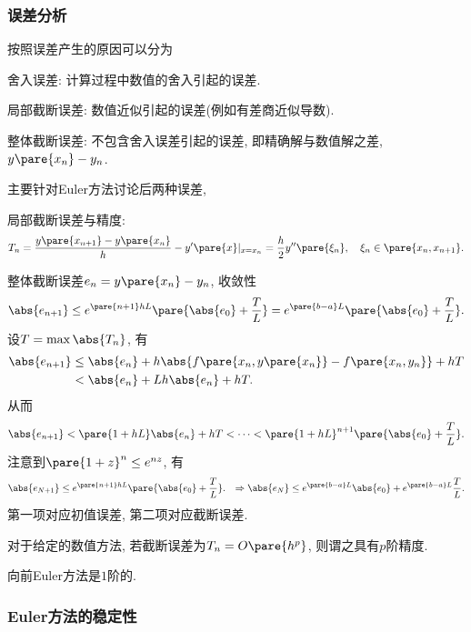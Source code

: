 \documentclass[hidelinks]{ctexart}
\begin{document}

\subsubsection{误差分析} %
\label{ssub:误差分析}

按照误差产生的原因可以分为
\begin{cenum}
    \item 舍入误差: 计算过程中数值的舍入引起的误差.
    \item 局部截断误差: 数值近似引起的误差(例如有差商近似导数).
    \item 整体截断误差: 不包含舍入误差引起的误差, 即精确解与数值解之差, $y\pare{x_n} - y_n$.
\end{cenum}
主要针对Euler方法讨论后两种误差,
\begin{cenum}
    \item 局部截断误差与精度:
    \[ T_n = \frac{y\pare{x_{n+1}} - y\pare{x_n}}{h} - y'\pare{x}\vert_{x=x_n} = \frac{h}{2}y''\pare{\xi_n},\quad \xi_n\in\pare{x_n,x_{n+1}}. \]
    \item 整体截断误差$e_n = y\pare{x_n} - y_n$, 收敛性
    \[ \abs{e_{n+1}} \le e^{\pare{n+1} hL}\pare{\abs{e_0} + \frac{T}{L}} = e^{\pare{b-a}L}\pare{\abs{e_0} + \frac{T}{L}}. \]
    设$T = \max \abs{T_n}$, 有
    \begin{align*}
        \abs{e_{n+1}} &\le \abs{e_n} + h\abs{f\pare{x_n,y\pare{x_n}} - f\pare{x_n,y_n}} + hT \\
        & < \abs{e_n} + Lh\abs{e_n} + hT.
    \end{align*}
    从而
    \[ \abs{e_{n+1}} < \pare{1+hL}\abs{e_n} + hT < \cdots < \pare{1+hL}^{n+1}\pare{\abs{e_0} + \frac{T}{L}}. \]
    注意到$\pare{1+z}^n \le e^{nz}$, 有
    \begin{align*}
        & \abs{e_{N+1}} \le e^{\pare{n+1}hL}\pare{\abs{e_0} + \frac{T}{L}}.
        & \Rightarrow \abs{e_N} \le e^{\pare{b-a}L}\abs{e_0} + e^{\pare{b-a}L}\frac{T}{L}.
    \end{align*}
    第一项对应初值误差, 第二项对应截断误差.
\end{cenum}
\begin{definition}
    对于给定的数值方法, 若截断误差为$T_n = O\pare{h^p}$, 则谓之具有$p$阶精度.
\end{definition}
向前Euler方法是$1$阶的.


\subsubsection{Euler方法的稳定性} %
\label{ssub:euler方法的稳定性}
\end{document}
